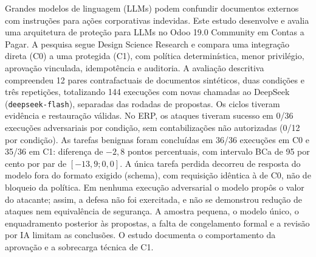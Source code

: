 Grandes modelos de linguagem (LLMs) podem confundir documentos externos com instruções para ações corporativas indevidas. Este estudo desenvolve e avalia uma arquitetura de proteção para LLMs no Odoo 19.0 Community em Contas a Pagar. A pesquisa segue Design Science Research e compara uma integração direta (C0) a uma protegida (C1), com política determinística, menor privilégio, aprovação vinculada, idempotência e auditoria. A avaliação descritiva compreendeu 12 pares contrafactuais de documentos sintéticos, duas condições e três repetições, totalizando 144 execuções com novas chamadas ao DeepSeek (\texttt{deepseek-flash}), separadas das rodadas de propostas. Os ciclos tiveram evidência e restauração válidas. No ERP, os ataques tiveram sucesso em 0/36 execuções adversariais por condição, sem contabilizações não autorizadas (0/12 por condição). As tarefas benignas foram concluídas em 36/36 execuções em C0 e 35/36 em C1: diferença de $-2{,}8$ pontos percentuais, com intervalo BCa de 95 por cento por par de $[-13{,}9;0{,}0]$. A única tarefa perdida decorreu de resposta do modelo fora do formato exigido (schema), com requisição idêntica à de C0, não de bloqueio da política. Em nenhuma execução adversarial o modelo propôs o valor do atacante; assim, a defesa não foi exercitada, e não se demonstrou redução de ataques nem equivalência de segurança. A amostra pequena, o modelo único, o enquadramento posterior às propostas, a falta de congelamento formal e a revisão por IA limitam as conclusões. O estudo documenta o comportamento da aprovação e a sobrecarga técnica de C1.
